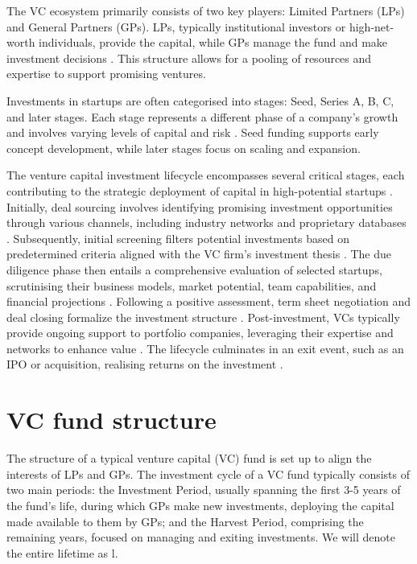 \documentclass[a4paper, oneside]{discothesis}
\begin{document}
The VC ecosystem primarily consists of two key players: Limited Partners (LPs) and General Partners (GPs). LPs, typically institutional investors or high-net-worth individuals, provide the capital, while GPs manage the fund and make investment decisions \cite{metrick2010venture}. This structure allows for a pooling of resources and expertise to support promising ventures.

Investments in startups are often categorised into stages: Seed, Series A, B, C, and later stages. Each stage represents a different phase of a company's growth and involves varying levels of capital and risk \cite{hellmann2002venture}. Seed funding supports early concept development, while later stages focus on scaling and expansion.

The venture capital investment lifecycle encompasses several critical stages, each contributing to the strategic deployment of capital in high-potential startups \cite{gompers2004venture}. Initially, deal sourcing involves identifying promising investment opportunities through various channels, including industry networks and proprietary databases \cite{sorenson2001syndication}. Subsequently, initial screening filters potential investments based on predetermined criteria aligned with the VC firm's investment thesis \cite{petty1994harvesting}. The due diligence phase then entails a comprehensive evaluation of selected startups, scrutinising their business models, market potential, team capabilities, and financial projections \cite{fried2003venture}. Following a positive assessment, term sheet negotiation and deal closing formalize the investment structure \cite{kaplan2003financial, cumming2006contracts}. Post-investment, VCs typically provide ongoing support to portfolio companies, leveraging their expertise and networks to enhance value \cite{sapienza1996venture}. The lifecycle culminates in an exit event, such as an IPO or acquisition, realising returns on the investment \cite{cumming2008preplanned}.

\section{VC fund structure}

The structure of a typical venture capital (VC) fund is set up to align the interests of LPs and GPs. The investment cycle of a VC fund typically consists of two main periods: the Investment Period, usually spanning the first 3-5 years of the fund's life, during which GPs make new investments, deploying the capital made available to them by GPs; and the Harvest Period, comprising the remaining years, focused on managing and exiting investments. We will denote the entire lifetime as l. 
\end{document}
